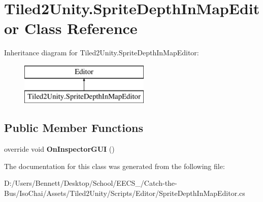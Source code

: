 \hypertarget{class_tiled2_unity_1_1_sprite_depth_in_map_editor}{}\section{Tiled2\+Unity.\+Sprite\+Depth\+In\+Map\+Editor Class Reference}
\label{class_tiled2_unity_1_1_sprite_depth_in_map_editor}
Inheritance diagram for Tiled2\+Unity.\+Sprite\+Depth\+In\+Map\+Editor\+:\begin{figure}[H]
\begin{center}
\leavevmode
\includegraphics[height=2.000000cm]{class_tiled2_unity_1_1_sprite_depth_in_map_editor}
\end{center}
\end{figure}
\subsection*{Public Member Functions}
\begin{DoxyCompactItemize}
\item 
\mbox{\label{class_tiled2_unity_1_1_sprite_depth_in_map_editor_aa56bfe7c8ed00dbe8ce3e20f52cd17c6}} 
override void {\bfseries On\+Inspector\+G\+UI} ()
\end{DoxyCompactItemize}


The documentation for this class was generated from the following file\+:\begin{DoxyCompactItemize}
\item 
D\+:/\+Users/\+Bennett/\+Desktop/\+School/\+E\+E\+C\+S\+\_/\+Catch-\/the-\/\+Bus/\+Iso\+Chai/\+Assets/\+Tiled2\+Unity/\+Scripts/\+Editor/Sprite\+Depth\+In\+Map\+Editor.\+cs\end{DoxyCompactItemize}
